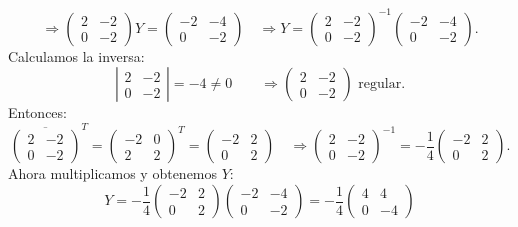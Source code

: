 \documentclass[a4paper,12pt]{article}
\begin{document}
\begin{ejercicio}[title=Ejercicio 24]
\[
\Rightarrow
\begin{pmatrix}
2 & -2\\
0 & -2
\end{pmatrix} Y
=
\begin{pmatrix}
-2 & -4\\
0 & -2
\end{pmatrix}
\quad
\Rightarrow
Y = 
\begin{pmatrix}
2 & -2\\
0 & -2
\end{pmatrix}^{-1}
\begin{pmatrix}
-2 & -4\\
0 & -2
\end{pmatrix}.
\]
Calculamos la inversa:
\[
\left|
\begin{matrix}
2 & -2\\
0 & -2
\end{matrix}
\right|
= -4 \neq 0
\qquad \Rightarrow
\begin{pmatrix}
    2 & -2\\
0 & -2
\end{pmatrix}
\text{ regular.}
\]
Entonces:
\[
\overline{\begin{pmatrix}2 & -2\\ 0 & -2\end{pmatrix}}^T
=
\begin{pmatrix}-2 & 0\\ 2 & 2\end{pmatrix}^T
=
\begin{pmatrix}
-2 & 2\\
0 & 2
\end{pmatrix}
\quad
\Rightarrow
\begin{pmatrix}
2 & -2\\
0 & -2
\end{pmatrix}^{-1}
= -\frac{1}{4}
\begin{pmatrix}
-2 & 2\\
0 & 2
\end{pmatrix}.
\]
Ahora multiplicamos y obtenemos $Y$:
\[
Y = -\frac{1}{4}
\begin{pmatrix}
-2 & 2\\
0 & 2
\end{pmatrix}
\begin{pmatrix}
-2 & -4\\
0 & -2
\end{pmatrix}
= -\frac{1}{4}
\begin{pmatrix}
4 & 4\\
0 & -4
\end{pmatrix}
\]
\end{ejercicio}
\end{document}
